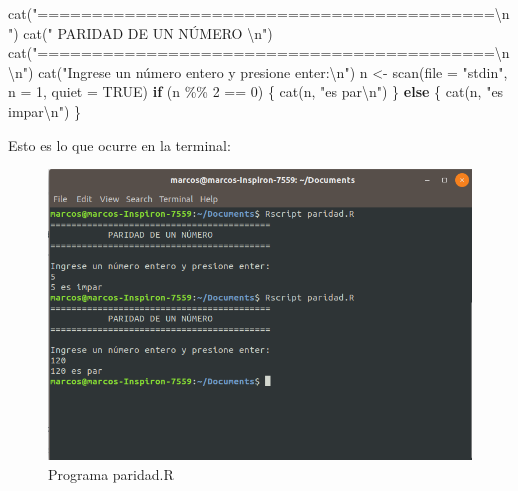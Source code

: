 \documentclass[
]{book}
\newenvironment{Shaded}{\begin{snugshade}}{\end{snugshade}}
\newcommand{\AttributeTok}[1]{\textcolor[rgb]{0.77,0.63,0.00}{#1}}
\newcommand{\ConstantTok}[1]{\textcolor[rgb]{0.00,0.00,0.00}{#1}}
\newcommand{\ControlFlowTok}[1]{\textcolor[rgb]{0.13,0.29,0.53}{\textbf{#1}}}
\newcommand{\DecValTok}[1]{\textcolor[rgb]{0.00,0.00,0.81}{#1}}
\newcommand{\FunctionTok}[1]{\textcolor[rgb]{0.00,0.00,0.00}{#1}}
\newcommand{\NormalTok}[1]{#1}
\newcommand{\OtherTok}[1]{\textcolor[rgb]{0.56,0.35,0.01}{#1}}
\newcommand{\SpecialCharTok}[1]{\textcolor[rgb]{0.00,0.00,0.00}{#1}}
\newcommand{\StringTok}[1]{\textcolor[rgb]{0.31,0.60,0.02}{#1}}
\begin{document}
\begin{Shaded}
\begin{Highlighting}[]
\FunctionTok{cat}\NormalTok{(}\StringTok{"==========================================}\SpecialCharTok{\textbackslash{}n}\StringTok{"}\NormalTok{)}
\FunctionTok{cat}\NormalTok{(}\StringTok{"           PARIDAD DE UN NÚMERO           }\SpecialCharTok{\textbackslash{}n}\StringTok{"}\NormalTok{)}
\FunctionTok{cat}\NormalTok{(}\StringTok{"==========================================}\SpecialCharTok{\textbackslash{}n\textbackslash{}n}\StringTok{"}\NormalTok{)}
\FunctionTok{cat}\NormalTok{(}\StringTok{"Ingrese un número entero y presione enter:}\SpecialCharTok{\textbackslash{}n}\StringTok{"}\NormalTok{)}
\NormalTok{n }\OtherTok{\textless{}{-}} \FunctionTok{scan}\NormalTok{(}\AttributeTok{file =} \StringTok{"stdin"}\NormalTok{, }\AttributeTok{n =} \DecValTok{1}\NormalTok{, }\AttributeTok{quiet =} \ConstantTok{TRUE}\NormalTok{)}
\ControlFlowTok{if}\NormalTok{ (n }\SpecialCharTok{\%\%} \DecValTok{2} \SpecialCharTok{==} \DecValTok{0}\NormalTok{) \{}
    \FunctionTok{cat}\NormalTok{(n, }\StringTok{"es par}\SpecialCharTok{\textbackslash{}n}\StringTok{"}\NormalTok{)}
\NormalTok{\} }\ControlFlowTok{else}\NormalTok{ \{}
    \FunctionTok{cat}\NormalTok{(n, }\StringTok{"es impar}\SpecialCharTok{\textbackslash{}n}\StringTok{"}\NormalTok{)}
\NormalTok{\}}
\end{Highlighting}
\end{Shaded}

Esto es lo que ocurre en la terminal:

\begin{figure}

{\centering \includegraphics[width=0.8\linewidth]{images/07_otros/consola2} 

}

\caption{Programa paridad.R}\label{fig:unnamed-chunk-162}
\end{figure}
\end{document}
